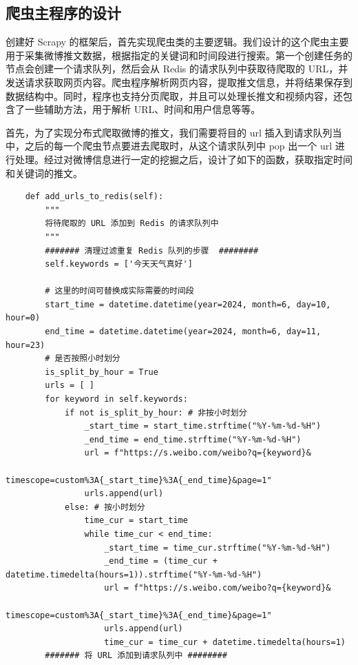\documentclass[12pt,hyperref,a4paper,UTF8]{ctexart}
\begin{document}
\subsection{爬虫主程序的设计}

创建好 Scrapy 的框架后，首先实现爬虫类的主要逻辑。我们设计的这个爬虫主要用于采集微博推文数据，根据指定的关键词和时间段进行搜索。第一个创建任务的节点会创建一个请求队列，然后会从 Redis 的请求队列中获取待爬取的 URL，并发送请求获取网页内容。爬虫程序解析网页内容，提取推文信息，并将结果保存到数据结构中。同时，程序也支持分页爬取，并且可以处理长推文和视频内容，还包含了一些辅助方法，用于解析 URL、时间和用户信息等等。

首先，为了实现分布式爬取微博的推文，我们需要将目的 url 插入到请求队列当中，之后的每一个爬虫节点要进去爬取时，从这个请求队列中 pop 出一个 url 进行处理。经过对微博信息进行一定的挖掘之后，设计了如下的函数，获取指定时间和关键词的推文。
\begin{verbatim}  
    def add_urls_to_redis(self):
        """
        将待爬取的 URL 添加到 Redis 的请求队列中
        """
        ####### 清理过滤重复 Redis 队列的步骤  ########
        self.keywords = ['今天天气真好']
        
        # 这里的时间可替换成实际需要的时间段
        start_time = datetime.datetime(year=2024, month=6, day=10, hour=0)
        end_time = datetime.datetime(year=2024, month=6, day=11, hour=23)
        # 是否按照小时划分
        is_split_by_hour = True    
        urls = [ ]
        for keyword in self.keywords:
            if not is_split_by_hour: # 非按小时划分
                _start_time = start_time.strftime("%Y-%m-%d-%H")
                _end_time = end_time.strftime("%Y-%m-%d-%H")
                url = f"https://s.weibo.com/weibo?q={keyword}&
                        timescope=custom%3A{_start_time}%3A{_end_time}&page=1"
                urls.append(url)
            else: # 按小时划分
                time_cur = start_time
                while time_cur < end_time:
                    _start_time = time_cur.strftime("%Y-%m-%d-%H")
                    _end_time = (time_cur + datetime.timedelta(hours=1)).strftime("%Y-%m-%d-%H")
                    url = f"https://s.weibo.com/weibo?q={keyword}&
                            timescope=custom%3A{_start_time}%3A{_end_time}&page=1"
                    urls.append(url)
                    time_cur = time_cur + datetime.timedelta(hours=1)     
        ####### 将 URL 添加到请求队列中 ########
\end{verbatim}
\end{document}
